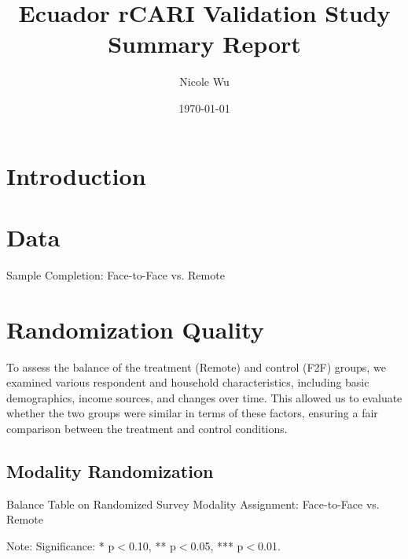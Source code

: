 \documentclass[11pt,harvard]{article}
\author{Nicole Wu}
\date{\today}
\title{Ecuador rCARI Validation Study Summary Report}
\begin{document}
	\maketitle \vspace{-1cm}
	\onehalfspacing
	\pagebreak
	\setlength{\parskip}{8pt} %
	
	\section{Introduction}
	
	
	\section{Data}
	
	\begin{table}[htbp]
		\centering
		\begin{adjustbox}{max width=\textwidth}
			\begin{threeparttable}
				\caption{Sample Completion: Face-to-Face vs. Remote}
				\scriptsize
				 
				\label{tab:Ecuador_rCARI_Completion}
			\end{threeparttable}
		\end{adjustbox}
	\end{table}
	
	\pagebreak
	
	\section{Randomization Quality}
	
	To assess the balance of the treatment (Remote) and control (F2F) groups, we examined various respondent and household characteristics, including basic demographics, income sources, and changes over time. This allowed us to evaluate whether the two groups were similar in terms of these factors, ensuring a fair comparison between the treatment and control conditions.
	
	\subsection{Modality Randomization}
	\begin{table}[htbp]
		\centering
		\begin{adjustbox}{max width=\textwidth}
			\begin{threeparttable}
				\caption{Balance Table on Randomized Survey Modality Assignment: Face-to-Face vs. Remote}
				\scriptsize
				 
				\label{tab:Ecuador_Demo_Modality_Balance}
				\begin{tablenotes}
					\item Note: Significance: * p$<$0.10, ** p$<$0.05, *** p$<$0.01. 
				\end{tablenotes}
			\end{threeparttable}
		\end{adjustbox}
	\end{table}
	
\end{document}
